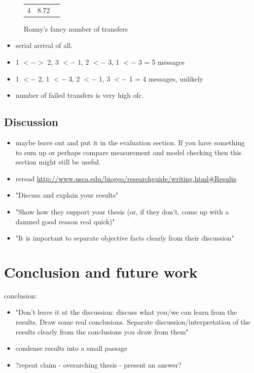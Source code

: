\documentclass[a4paper, 10pt]{article}
\begin{document}
\begin{itemize}
\begin{itemize}
\begin{figure}[htbp]
\begin{tabular}{r | r r}
						4       & 8.72                  \\
					\end{tabular}
					\caption{Ronny's fancy number of transfers}
					\label{fig:df-transfers-1000000}
				\end{figure}
				\begin{itemize}
					\item serial arrival of all.
					\item 1 $<->$ 2, 3 $<-$ 1, 2 $<-$ 3, 1 $<-$ 3 = 5 messages
					\item 1 $<-$ 2, 1 $<-$ 3, 2 $<-$ 1, 3 $<-$ 1 = 4 messages, unlikely
					\item number of failed transfers is very high ofc.
				\end{itemize}
		\end{itemize}
\end{itemize}

\subsection{Discussion}
\label{ssec:analysis-discussion}
\begin{itemize}
	\item maybe leave out and put it in the evaluation section. If you have something to sum up or perhaps compare measurement and model checking then this section might still be useful.
	\item reread \url{http://www.usca.edu/biogeo/researchguide/writing.html#Results}
	\item "Discuss and explain your results"
	\item "Show how they support your thesis (or, if they don't, come up with a damned good reason real quick)"
	\item "It is important to separate objective facts clearly from their discussion"
\end{itemize}

\section{Conclusion and future work}
\label{sec:conclusion}
conclusion:
\begin{itemize}
	\item "Don't leave it at the discussion: discuss what you/we can learn from the results. Draw some real conclusions. Separate discussion/interpretation of the results clearly from the conclusions you draw from them"
	\item condense results into a small passage
	\item ?repeat claim - overarching thesis - present an answer?
\end{itemize}
\end{document}
